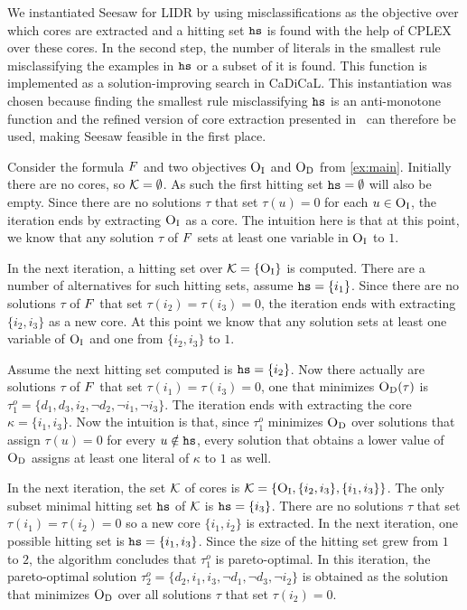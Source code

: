 We instantiated Seesaw for LIDR
by using misclassifications as the objective over which cores are extracted and a hitting set $\texttt{hs}$ is found with the help of CPLEX over these cores.
In the second step, the number of literals in the smallest rule misclassifying the examples in $\texttt{hs}$ or a subset of it is found.
This function is implemented as a solution-improving search  in CaDiCaL.
This instantiation was chosen because finding the smallest rule misclassifying $\texttt{hs}$ is an anti-monotone function and the refined version of core extraction presented in~\textcite{DBLP:conf/cp/JanotaMSM21} can therefore be used, making Seesaw feasible in the first place.

\begin{example}
Consider the formula $F$ and two objectives $\textsc{O}_{\text{I}}$ and $\textsc{O}_{\text{D}}$ from \cref{ex:main}. 
Initially there are no cores, so $\mathcal{K} = \emptyset$. As such the first hitting set $\texttt{hs} = \emptyset$ will also be empty.
Since there are no solutions $\tau$ that set $\tau(u) = 0$ for each $u \in \textsc{O}_{\text{I}}$, the iteration ends by extracting $\textsc{O}_{\text{I}}$ as a core. 
The intuition here is that at this point, we know that any solution $\tau$ of $F$ sets at least one variable in $\textsc{O}_{\text{I}}$ to $1$.

In the next iteration, a hitting set over $\mathcal{K} = \{ \textsc{O}_{\text{I}} \}$ is computed. There are a number of alternatives for such hitting sets, assume $\texttt{hs} = \{ i_1 \}$.
Since there are no solutions $\tau$ of $F$ that set $\tau(i_2) = \tau(i_3) = 0$, the iteration ends with extracting $\{ i_2, i_3\}$ as a new core.
At this point we know that any solution sets at least one variable of $\textsc{O}_{\text{I}}$ and one from $\{i_2, i_3\}$ to $1$.

Assume the next hitting set computed is $\texttt{hs} = \{i_2\}$. Now there actually are solutions $\tau$ of $F$ that set $\tau(i_1) = \tau(i_3) = 0$, one that minimizes 
$\textsc{O}_{\text{D}}(\tau)$ is $\tau^o_1 = \{d_1, d_3, i_2, \lnot d_2, \lnot i_1, \lnot i_3 \}$. The iteration ends with extracting the core
$\kappa = \{i_1, i_3\}$. Now the intuition is that, since $\tau^o_1$ minimizes $\textsc{O}_{\text{D}}$ over solutions that assign $\tau(u) = 0$ for every $u \notin \texttt{hs}$, every solution that obtains a lower value of $\textsc{O}_{\text{D}}$
assigns at least one literal of $\kappa$ to $1$ as well. 

In the next iteration, the set $\mathcal{K}$ of cores is $\mathcal{K} = \{ \textsc{O}_{\text{I}}, \{i_2, i_3\}, \{i_1, i_3\}\}$. The only subset minimal hitting set $\texttt{hs}$ of $\mathcal{K}$ is $\texttt{hs} = \{i_3\}$.
There are no solutions $\tau$ that set $\tau(i_1) = \tau(i_2) = 0$ so a new core $\{i_1, i_2\}$ is extracted. 
In the next iteration, one possible hitting set is $\texttt{hs} = \{i_1, i_3\}$. Since the size of the hitting set grew from $1$ to $2$, the algorithm concludes that $\tau^o_1$ is pareto-optimal. 
In this iteration, the pareto-optimal solution $\tau^o_2 = \{d_2, i_1, i_3, \lnot d_1, \lnot d_3, \lnot i_2 \}$ is obtained 
as the solution that minimizes $\textsc{O}_{\text{D}}$ over all solutions $\tau$ that set $\tau(i_2) = 0$.  


\end{example}
